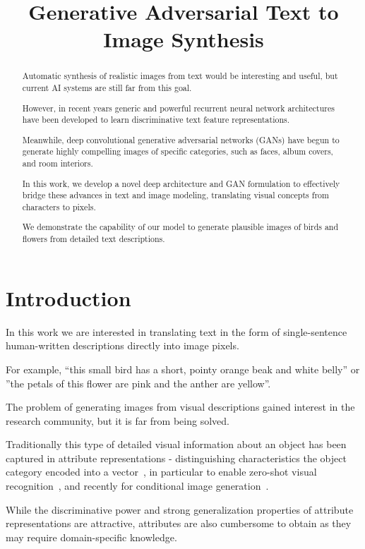 \title{Generative Adversarial Text to Image Synthesis}

\begin{abstract}
Automatic synthesis of realistic images from text would be interesting and useful, but current AI systems are still far from this goal.

However, in recent years generic and powerful recurrent neural network architectures have been developed to learn discriminative text feature representations.

Meanwhile, deep convolutional generative adversarial networks (GANs) have begun to generate highly compelling images of specific categories, such as faces, album covers, and room interiors.

In this work, we develop a novel deep architecture and GAN formulation to effectively bridge these advances in text and image modeling, translating visual concepts from characters to pixels.

We demonstrate the capability of our model to generate plausible images of birds and flowers from detailed text descriptions.
\end{abstract}

\section{Introduction}
\label{intro}

In this work we are interested in translating text in the form of single-sentence human-written descriptions directly into image pixels.

For example, ``this small bird has a short, pointy orange beak and white belly'' or ''the petals of this flower are pink and the anther are yellow''.

The problem of generating images from visual descriptions gained interest in the research community, but it is far from being solved.

Traditionally this type of detailed visual information about an object has been captured in attribute representations - distinguishing characteristics the object category encoded into a vector~\cite{farhadi2009describing,kumar2009attribute,parikh2011relative,LNH13}, in particular to enable zero-shot visual recognition~\cite{FHXFG14,ARWLS15}, and recently for conditional image generation~\cite{yan2015attribute2image}.

While the discriminative power and strong generalization properties of attribute representations are attractive, attributes are also cumbersome to obtain as they may require domain-specific knowledge.

